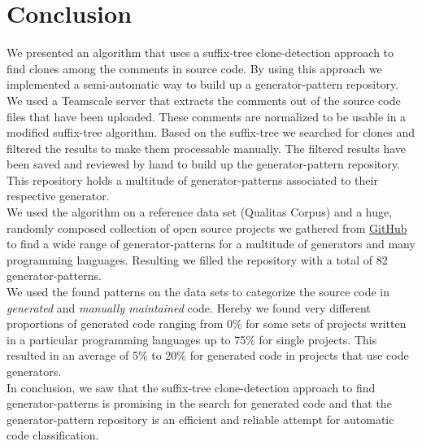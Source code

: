 
\chapter{Conclusion}\label{chapter:conclusion}
We presented an algorithm that uses a suffix-tree clone-detection approach to find clones among the comments in source code. By using this approach we implemented a semi-automatic way to build up a generator-pattern repository.\\
We used a Teamscale server that extracts the comments out of the source code files that have been uploaded. These comments are normalized to be usable in a modified suffix-tree algorithm. Based on the suffix-tree we searched for clones and filtered the results to make them processable manually. The filtered results have been saved and reviewed by hand to build up the generator-pattern repository. This repository holds a multitude of generator-patterns associated to their respective generator.\\
We used the algorithm on a reference data set (Qualitas Corpus) and a huge, randomly composed collection of open source projects we gathered from \href{https://github.com}{GitHub} to find a wide range of generator-patterns for a multitude of generators and many programming languages. Resulting we filled the repository with a total of 82 generator-patterns.\\
We used the found patterns on the data sets to categorize the source code in \textit{generated} and \textit{manually maintained} code. Hereby we found very different proportions of generated code ranging from 0\% for some sets of projects written in a particular programming languages up to 75\% for single projects. This resulted in an average of 5\% to 20\% for generated code in projects that use code generators.\\
In conclusion, we saw that the suffix-tree clone-detection approach to find generator-patterns is promising in the search for generated code and that the generator-pattern repository is an efficient and reliable attempt for automatic code classification.